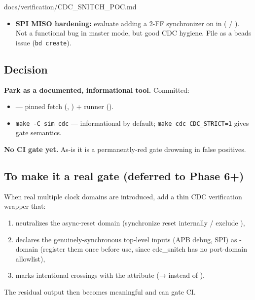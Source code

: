 \begin{relocated}{docs/verification/CDC_SNITCH_POC.md}
\begin{itemize}
\tightlist
\item
  \textbf{SPI MISO hardening:} evaluate adding a 2-FF synchronizer on
   in 
  ( / ). Not a functional bug
  in master mode, but good CDC hygiene. File as a beads issue
  (\texttt{bd\ create}).
\end{itemize}

\subsection{Decision}\label{tm:flow:cdc-snitch-poc:decision}

\textbf{Park as a documented, informational tool.} Committed:

\begin{itemize}
\tightlist
\item
   --- pinned fetch (,
  ) + runner ().
\item
  \texttt{make\ -\allowbreak{}C\ sim\ cdc} --- informational by default;
  \texttt{make\ cdc\ CDC\_\allowbreak{}STRICT=\allowbreak{}1} gives gate
  semantics.
\end{itemize}

\textbf{No CI gate yet.} As-is it is a permanently-red gate drowning in
false positives.

\subsection{To make it a real gate (deferred to Phase 6+)}\label{tm:flow:cdc-snitch-poc:to-make-it-a-real-gate-deferred-to-phase-6}

When real multiple clock domains are introduced, add a thin CDC
verification wrapper that:

\begin{enumerate}
\def\labelenumi{\arabic{enumi}.}
\tightlist
\item
  neutralizes the async-reset domain (synchronize reset internally /
  exclude ),
\item
  declares the genuinely-synchronous top-level inputs (APB debug, SPI)
  as -domain (register them once before use, since
  cdc\_\allowbreak{}snitch has no port-domain allowlist),
\item
  marks intentional crossings with the  attribute (→
   instead of ).
\end{enumerate}

The residual output then becomes meaningful and  can gate
CI.
\end{relocated}

